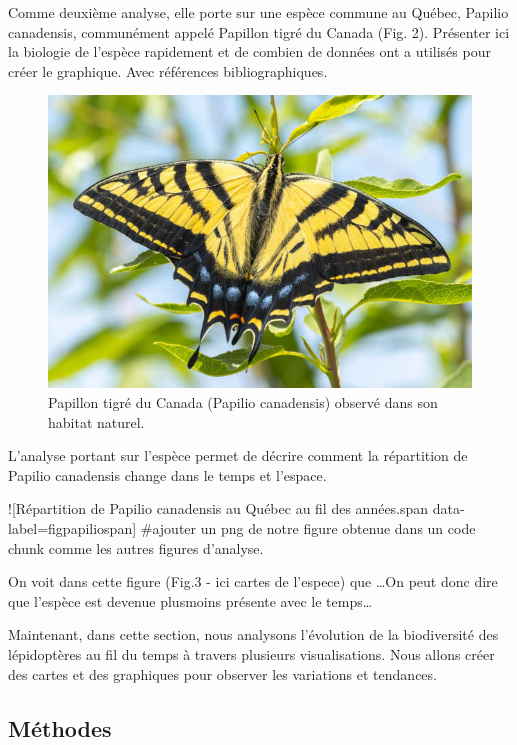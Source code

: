 \documentclass[9pt,twocolumn,twoside,]{pnas-new}
\begin{document}
Comme deuxième analyse, elle porte sur une espèce commune au Québec,
Papilio canadensis, communément appelé Papillon tigré du Canada (Fig.
2). Présenter ici la biologie de l'espèce rapidement et de combien de
données ont a utilisés pour créer le graphique. Avec références
bibliographiques.

\begin{figure}
\centering
\includegraphics{Papilio_canadensis.png}
\caption{Papillon tigré du Canada (Papilio canadensis) observé dans son
habitat naturel.}
\end{figure}

L'analyse portant sur l'espèce permet de décrire comment la répartition
de Papilio canadensis change dans le temps et l'espace.

!{[}Répartition de Papilio canadensis au Québec au fil des années.span
data-label=figpapiliospan{]} \#ajouter un png de notre figure obtenue
dans un code chunk comme les autres figures d'analyse.

On voit dans cette figure (Fig.3 - ici cartes de l'espece) que \ldots On
peut donc dire que l'espèce est devenue plusmoins présente avec le
temps\ldots{}

Maintenant, dans cette section, nous analysons l'évolution de la
biodiversité des lépidoptères au fil du temps à travers plusieurs
visualisations. Nous allons créer des cartes et des graphiques pour
observer les variations et tendances.

\subsection{\texorpdfstring{\textbf{Méthodes}}{Méthodes}}\label{muxe9thodes}
\end{document}

